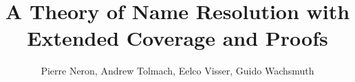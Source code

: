 \documentclass[letterpaper,twoside,10pt]{book}
\title{A Theory of Name Resolution with Extended Coverage and Proofs}
\author{Pierre Neron, Andrew Tolmach, Eelco Visser, Guido Wachsmuth}
\begin{document}
\maketitle

\makebackpage
\end{document}
